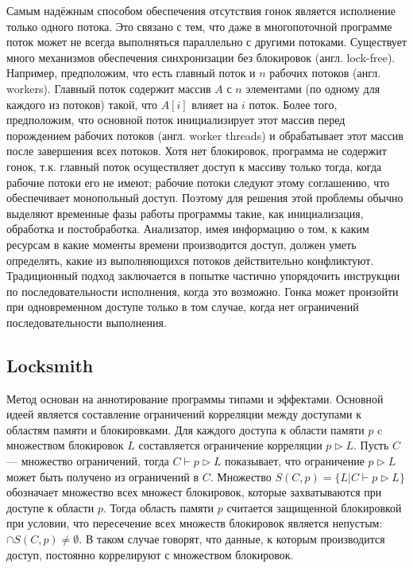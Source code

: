 Самым надёжным способом обеспечения отсутствия гонок является исполнение только одного потока. Это связано с тем, что даже в многопоточной программе поток может не всегда выполняться параллельно с другими потоками. Существует много механизмов обеспечения синхронизации без блокировок (англ. lock-free). Например, предположим, что есть главный поток и $n$ рабочих потоков (англ. workers). Главный поток содержит массив $A$ с $n$ элементами (по одному для каждого из потоков) такой, что $A[i]$ влияет на $i$  поток. Более того, предположим, что основной поток инициализирует этот массив перед порождением рабочих потоков (англ. worker threads) и обрабатывает этот массив после завершения всех потоков. Хотя нет блокировок, программа не содержит гонок, т.к. главный поток осуществляет доступ к массиву только тогда, когда рабочие потоки его не имеют; рабочие потоки следуют этому соглашению, что обеспечивает монопольный доступ. Поэтому для решения этой проблемы обычно выделяют временные фазы работы программы такие, как инициализация, обработка и постобработка. Анализатор, имея информацию о том, к каким ресурсам в какие моменты времени производится доступ, должен уметь определять, какие из выполняющихся потоков действительно конфликтуют. Традиционный подход заключается в попытке частично упорядочить инструкции по последовательности исполнения, когда это возможно. Гонка может произойти при одновременном доступе только в том случае, когда нет ограничений последовательности выполнения.

\subsection{Locksmith}

Метод основан на аннотирование программы типами и эффектами. Основной идеей является составление ограничений корреляции между доступами к областям памяти и блокировками. Для каждого доступа к области памяти $p$ c множеством блокировок $L$ составляется ограничение корреляции $p \triangleright L$. Пусть $C$  — множество ограничений, тогда $C \vdash p \triangleright L$ показывает, что ограничение $p \triangleright L$ может быть получено из ограничений в $C$. Множество $S(C, p) = \{L | C \vdash p \triangleright L\}$ обозначает множество всех множест блокировок, которые захватываются при доступе к области $p$. Тогда область памяти $p$ считается защищенной блокировкой при условии, что пересечение всех множеств блокировок является непустым: $\cap S(C, p) \neq \emptyset$. В таком случае говорят, что данные, к которым производится доступ, постоянно коррелируют с множеством блокировок.

